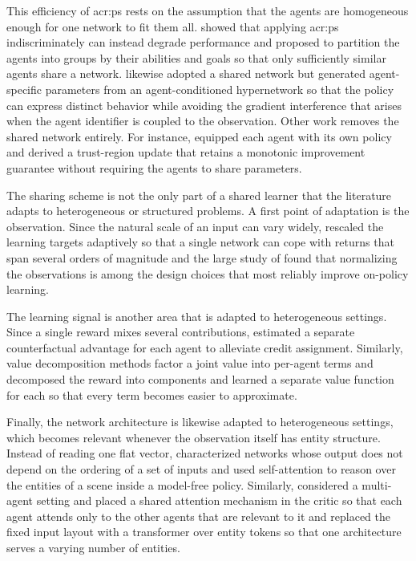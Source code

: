 This efficiency of \gls{acr:ps} rests on the assumption that the agents are homogeneous enough for one network to fit them all. \citet{christianos2021scaling} showed that applying \gls{acr:ps} indiscriminately can instead degrade performance and proposed to partition the agents into groups by their abilities and goals so that only sufficiently similar agents share a network. \citet{tessera2025hypermarl} likewise adopted a shared network but generated agent-specific parameters from an agent-conditioned hypernetwork so that the policy can express distinct behavior while avoiding the gradient interference that arises when the agent identifier is coupled to the observation. Other work removes the shared network entirely. For instance, \citet{kuba2022trust} equipped each agent with its own policy and derived a trust-region update that retains a monotonic improvement guarantee without requiring the agents to share parameters.

The sharing scheme is not the only part of a shared learner that the literature adapts to heterogeneous or structured problems. A first point of adaptation is the observation. Since the natural scale of an input can vary widely, \citet{vanhasselt2016learning} rescaled the learning targets adaptively so that a single network can cope with returns that span several orders of magnitude and the large study of \citet{andrychowicz2020matters} found that normalizing the observations is among the design choices that most reliably improve on-policy learning. 

The learning signal is another area that is adapted to heterogeneous settings. Since a single reward mixes several contributions, \citet{foerster2018counterfactual} estimated a separate counterfactual advantage for each agent to alleviate credit assignment. Similarly, value decomposition methods factor a joint value into per-agent terms \citep[e.g.,][]{sunehag2018value, rashid2018qmix} and \citet{van2017hybrid} decomposed the reward into components and learned a separate value function for each so that every term becomes easier to approximate.

Finally, the network architecture is likewise adapted to heterogeneous settings, which becomes relevant whenever the observation itself has entity structure. Instead of reading one flat vector, \citet{zaheer2017deep} characterized networks whose output does not depend on the ordering of a set of inputs and \citet{zambaldi2019deep} used self-attention to reason over the entities of a scene inside a model-free policy. Similarly, \citet{iqbal2019actor} considered a multi-agent setting and placed a shared attention mechanism in the critic so that each agent attends only to the other agents that are relevant to it and \citet{hu2021updet} replaced the fixed input layout with a transformer over entity tokens so that one architecture serves a varying number of entities.\\

